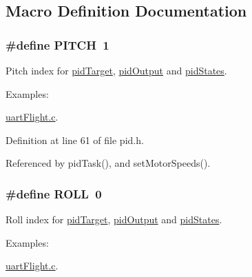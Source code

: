 \subsection{Macro Definition Documentation}
\hypertarget{group__pid_gacd633835a520a62245ec6cfeb6d00e97}{
\subsubsection[{P\-I\-T\-C\-H}]{\setlength{\rightskip}{0pt plus 5cm}\#define P\-I\-T\-C\-H~1}}\label{group__pid_gacd633835a520a62245ec6cfeb6d00e97}


Pitch index for \hyperlink{group__pid_ga260bc1ef7a231f2252e6e69e1e459ba6}{pid\-Target}, \hyperlink{group__pid_ga5b70790e470e0c5812d24a8a098c01e0}{pid\-Output} and \hyperlink{group__pid_ga9ce36f9a8e0e12e30b448e0161e3e5ec}{pid\-States}. 

\begin{Desc}
\item[Examples\-: ]\par
\hyperlink{uart_flight_8c-example}{uart\-Flight.\-c}.\end{Desc}


Definition at line 61 of file pid.\-h.



Referenced by pid\-Task(), and set\-Motor\-Speeds().

\hypertarget{group__pid_gaf902416f65138704a180dbae2dc9d8f2}{
\subsubsection[{R\-O\-L\-L}]{\setlength{\rightskip}{0pt plus 5cm}\#define R\-O\-L\-L~0}}\label{group__pid_gaf902416f65138704a180dbae2dc9d8f2}


Roll index for \hyperlink{group__pid_ga260bc1ef7a231f2252e6e69e1e459ba6}{pid\-Target}, \hyperlink{group__pid_ga5b70790e470e0c5812d24a8a098c01e0}{pid\-Output} and \hyperlink{group__pid_ga9ce36f9a8e0e12e30b448e0161e3e5ec}{pid\-States}. 

\begin{Desc}
\item[Examples\-: ]\par
\hyperlink{uart_flight_8c-example}{uart\-Flight.\-c}.\end{Desc}


